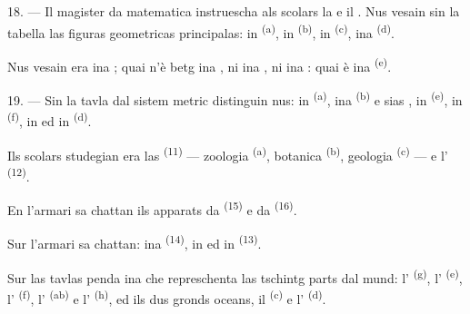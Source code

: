 \VUsaut{5.0mm}
\VUsaut{3.6mm}

18. --- Il magister da matematica instruescha als scolars la  e il . Nus vesain sin la tabella las
figuras geometricas principalas: in  \textsuperscript{(a)}, in
 \textsuperscript{(b)}, in  \textsuperscript{(c)},
ina  \textsuperscript{(d)}.

Nus vesain era ina ; quai n'è betg ina , ni ina
, ni ina : quai è ina 
\textsuperscript{(e)}.

19. --- Sin la tavla dal sistem metric distinguin nus: in 
\textsuperscript{(a)}, ina  \textsuperscript{(b)} e sias
, in  \textsuperscript{(e)}, in 
\textsuperscript{(f)}, in  ed in 
\textsuperscript{(d)}.

Ils scolars studegian era las  \textsuperscript{(11)}
--- zoologia \textsuperscript{(a)}, botanica \textsuperscript{(b)}, geologia
\textsuperscript{(c)} --- e l' \textsuperscript{(12)}.

En l'armari sa chattan ils apparats da  \textsuperscript{(15)} e da
 \textsuperscript{(16)}.

Sur l'armari sa chattan: ina  \textsuperscript{(14)}, in
 ed in  \textsuperscript{(13)}.

Sur las tavlas penda ina  che represchenta las tschintg parts dal
mund: l' \textsuperscript{(g)}, l'
\textsuperscript{(e)}, l' \textsuperscript{(f)},
l' \textsuperscript{(ab)} e l'
\textsuperscript{(h)}, ed ils dus gronds oceans, il 
\textsuperscript{(c)} e l' \textsuperscript{(d)}.
\VUsaut{6.0mm}
\VUfilet{22mm}
